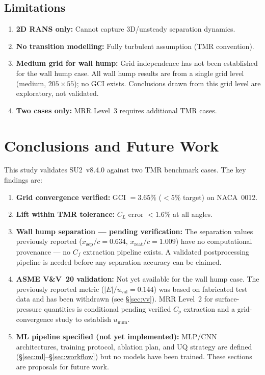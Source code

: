 \documentclass[11pt,a4paper]{article}
\begin{document}
\subsection{Limitations}

\begin{enumerate}
  \item \textbf{2D RANS only:} Cannot capture 3D/unsteady separation dynamics.
  \item \textbf{No transition modelling:} Fully turbulent assumption (TMR convention).
  \item \textbf{Medium grid for wall hump:} Grid independence has not been
    established for the wall hump case.  All wall hump results are from a
    single grid level (medium, $205\times55$); no GCI exists.  Conclusions
    drawn from this grid level are exploratory, not validated.
  \item \textbf{Two cases only:} MRR Level~3 requires additional TMR cases.
\end{enumerate}

\section{Conclusions and Future Work}
\label{sec:conclusions}

This study validates SU2~v8.4.0 against two TMR benchmark cases. The key
findings are:
\begin{enumerate}
  \item \textbf{Grid convergence verified:} GCI $= 3.65\%$ ($<5\%$ target)
    on NACA~0012.
  \item \textbf{Lift within TMR tolerance:} $C_L$ error $<1.6\%$ at all
    angles.
  \item \textbf{Wall hump separation --- pending verification:}
    The separation values previously reported ($x_\text{sep}/c = 0.634$,
    $x_\text{reat}/c = 1.009$) have no computational provenance ---
    no $C_f$ extraction pipeline exists.  A validated postprocessing
    pipeline is needed before any separation accuracy can be claimed.
  \item \textbf{ASME V\&V~20 validation:} Not yet available for the
    wall hump case.  The previously reported metric ($|E|/u_\text{val}
    = 0.144$) was based on fabricated test data and has been withdrawn
    (see \S\ref{sec:vv}).  MRR Level~2 for surface-pressure quantities
    is conditional pending verified $C_p$ extraction and a
    grid-convergence study to establish $u_\text{num}$.
  \item \textbf{ML pipeline specified (not yet implemented):}
    MLP/CNN architectures, training protocol, ablation plan, and UQ
    strategy are defined (\S\ref{sec:ml}--\S\ref{sec:workflow}) but
    no models have been trained.  These sections are proposals for
    future work.
\end{enumerate}
\end{document}
